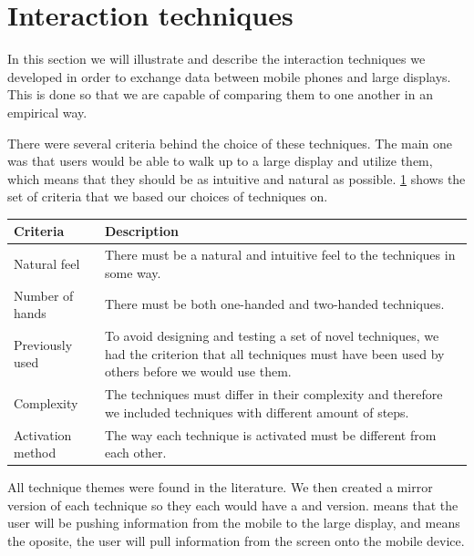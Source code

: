\section{Interaction techniques} \label{sec:techniques}
In this section we will illustrate and describe the interaction techniques we developed in order to exchange data between mobile phones and large displays.
This is done so that we are capable of comparing them to one another in an empirical way.

There were several criteria behind the choice of these techniques. 
The main one was that users would be able to walk up to a large display and utilize them, which means that they should be as intuitive and natural as possible. 
\cref{tab:techniqueCriteria} shows the set of criteria that we based our choices of techniques on.

\begin{table}[H]
	\centering
	\begin{tabular}{|p{}|p{}|}
		\hline
		\rowcolor[HTML]{9B9B9B} 
		\textbf{Criteria} & \textbf{Description} \\ \hline
		Natural feel & There must be a natural and intuitive feel to the techniques in some way. \\ \hline
		Number of hands & There must be both one-handed and two-handed techniques. \\ \hline
		Previously used & To avoid designing and testing a set of novel techniques, we had the criterion that all techniques must have been used by others before we would use them. \\ \hline
		Complexity & The techniques must differ in their complexity and therefore we included techniques with different amount of steps. \\ \hline
		Activation method & The way each technique is activated must be different from each other. \\ \hline
	\end{tabular}
	\label{tab:techniqueCriteria}
\end{table}


All technique themes were found in the literature.
We then created a mirror version of each technique so they each would have a \push and \pull version.
\push means that the user will be pushing information from the mobile to the large display, and \pull means the oposite, the user will pull information from the screen onto the mobile device. 

